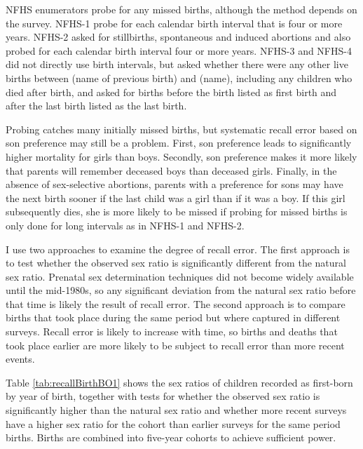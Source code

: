 \documentclass[12pt,letterpaper]{article}
\begin{document}
NFHS enumerators probe for any missed births, although the method depends on the survey.
NFHS-1 probe for each calendar birth interval that is four or more years.
NFHS-2 asked for stillbirths, spontaneous and induced abortions and also probed 
for each calendar birth interval four or more years.
NFHS-3 and NFHS-4 did not directly use birth intervals, but asked whether there were any 
other live births between (name of previous birth) and (name), including any children who 
died after birth, and asked for births before the birth listed as first birth and
after the last birth listed as the last birth.

Probing catches many initially missed births, but systematic recall error based on son
preference may still be a problem.
First, son preference leads to significantly higher mortality for girls than boys.
Secondly, son preference makes it more likely that parents will remember deceased boys 
than deceased girls.
Finally, in the absence of sex-selective abortions, parents with a preference for sons may
have the next birth sooner if the last child was a girl than if it was a boy.
If this girl subsequently dies, she is more likely to be missed if probing for missed 
births is only done for long intervals as in NFHS-1 and NFHS-2.

I use two approaches to examine the degree of recall error.
The first approach is to test whether the observed sex ratio is significantly different
from the natural sex ratio.
Prenatal sex determination techniques did not become widely available until the mid-1980s, 
so any significant deviation from the natural sex ratio before that time is likely the 
result of recall error.
The second approach is to compare births that took place during the same period but
where captured in different surveys.
Recall error is likely to increase with time, so births and deaths that took place earlier 
are more likely to be subject to recall error than more recent events.

Table \ref{tab:recallBirthBO1} shows the sex ratios of children recorded as first-born by 
year of birth, together with tests for whether the observed sex ratio is significantly 
higher than the natural sex ratio and whether more recent surveys have a higher sex ratio 
for the cohort than earlier surveys for the same period births.
Births are combined into five-year cohorts to achieve sufficient power.



% 
\end{document}
